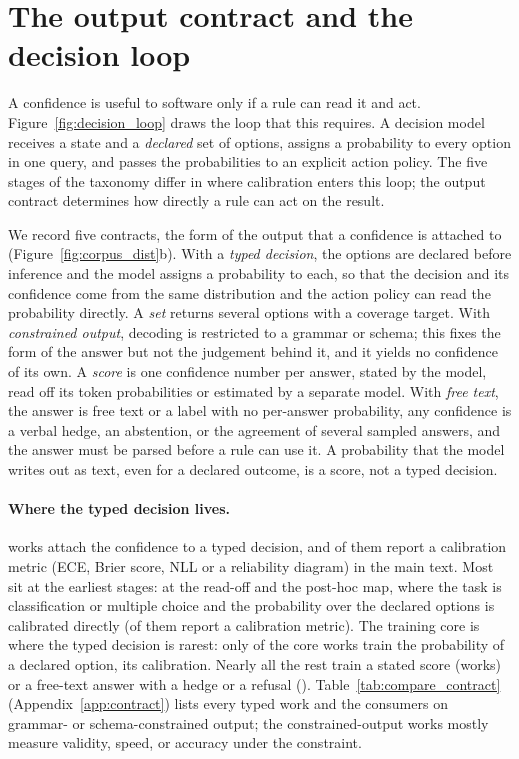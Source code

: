 \section{The output contract and the decision loop}
\label{sec:contract}

A confidence is useful to software only if a rule can read it and act. Figure~\ref{fig:decision_loop}
draws the loop that this requires. A decision model receives a state and a \emph{declared} set of
options, assigns a probability to every option in one query, and passes the probabilities to an explicit
action policy. The five stages of the taxonomy differ in where calibration enters this loop; the output
contract determines how directly a rule can act on the result.



We record five contracts, the form of the output that a confidence is attached to
(Figure~\ref{fig:corpus_dist}b). With a \emph{typed decision}, the options are declared before
inference and the model assigns a probability to each, so that the decision and its confidence come
from the same distribution and the action policy can read the probability directly. A \emph{set}
returns several options with a coverage target. With \emph{constrained output}, decoding is restricted
to a grammar or schema; this fixes the form of the answer but not the judgement behind it, and it yields
no confidence of its own. A \emph{score} is one confidence number per answer, stated by the model, read
off its token probabilities or estimated by a separate model. With \emph{free text}, the answer is
free text or a label with no per-answer probability, any confidence is a verbal hedge, an abstention, or
the agreement of several sampled answers, and the answer must be parsed before a rule can use it. A
probability that the model writes out as text, even for a declared outcome, is a score, not a typed
decision. \contractUnknownPhrase{}

\paragraph{Where the typed decision lives.} \nContractTyped works attach the confidence to a typed
decision, and \nTypedCal of them report a calibration metric (ECE, Brier score, NLL or a reliability
diagram) in the main text. Most sit at the earliest stages: \nTypedReadPost at the read-off and the
post-hoc map, where the task is classification or multiple choice and the probability over the declared
options is calibrated directly (\nTypedReadPostCal of them report a calibration metric). \typedOtherStages{} The training core is where the typed decision is rarest: only \nCoreTyped of the \nCore core
works train the probability of a declared option, \coreTypedCalPhrase{} its
calibration. Nearly all the rest train a stated score (\nCoreScore works) or a free-text answer with a hedge or a
refusal (\nCoreFree). Table~\ref{tab:compare_contract} (Appendix~\ref{app:contract}) lists every typed work and the \nConstrained
consumers on grammar- or schema-constrained output; the constrained-output works mostly measure
validity, speed, or accuracy under the constraint.

